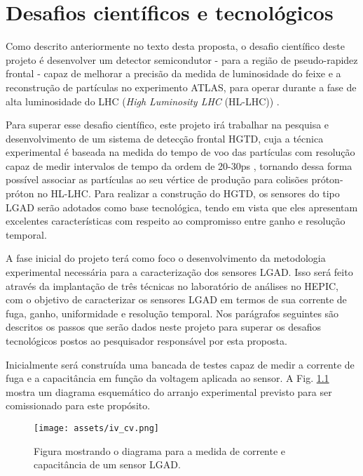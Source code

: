 \chapter{Desafios científicos e tecnológicos}

Como descrito anteriormente no texto desta proposta, o desafio científico deste projeto é desenvolver um detector semicondutor - para a região de pseudo-rapidez frontal - capaz de melhorar a precisão da medida de luminosidade do feixe e a reconstrução de partículas no experimento ATLAS, para operar durante a fase de alta luminosidade do LHC ({\it High Luminosity LHC} (HL-LHC)) \cite{tdr}. 

Para superar esse desafio científico, este projeto irá trabalhar na pesquisa e desenvolvimento de um sistema de detecção frontal HGTD, cuja a técnica experimental é baseada na medida do tempo de voo das partículas com resolução capaz de medir intervalos de tempo da ordem de 20-30ps \cite{tdr}, tornando dessa forma possível associar as partículas ao seu vértice de produção para colisões próton-próton no HL-LHC. Para realizar a construção do HGTD, os sensores do tipo LGAD serão adotados como base tecnológica, tendo em vista que eles apresentam excelentes características com respeito ao compromisso entre ganho e resolução temporal. 

A fase inicial do projeto terá como foco o desenvolvimento da metodologia experimental necessária para a caracterização dos sensores LGAD. Isso será feito através da implantação de três técnicas no laboratório de análises no HEPIC, com o objetivo de caracterizar os sensores LGAD em termos de sua corrente de fuga, ganho, uniformidade e resolução temporal. Nos parágrafos seguintes são descritos os passos que serão dados neste projeto para superar os desafios tecnológicos postos ao pesquisador responsável por esta proposta. 

Inicialmente será construída uma bancada de testes capaz de medir a corrente de fuga e a capacitância em função da voltagem aplicada ao sensor. A Fig. \ref{setup1} mostra um diagrama esquemático do arranjo experimental previsto para ser comissionado para este propósito.

\begin{figure}
    \centering
    \texttt{[image: assets/iv\_cv.png]}
    \caption{Figura mostrando o diagrama para a medida de corrente e capacitância de um sensor LGAD.}
    \label{setup1}
\end{figure}


